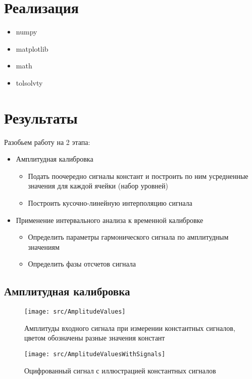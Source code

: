 \documentclass[a4paper]{article}
\begin{document}
\section{Реализация}
\begin{itemize}
    \item numpy
    \item matplotlib
    \item math
    \item tolsolvty
\end{itemize}

\section{Результаты}
    Разобьем работу на 2 этапа:
    \begin{itemize}
        \item Амплитудная калибровка
        \begin{itemize}
            \item Подать поочередно сигналы констант и построить по ним усредненные значения для каждой ячейки (набор уровней)
            \item Построить кусочно-линейную интерполяцию сигнала
        \end{itemize}
        \item Применение интервального анализа к временной калибровке
            \begin{itemize}
                \item Определить параметры гармонического сигнала по амплитудным значениям
                \item Определить фазы отсчетов сигнала
            \end{itemize}
    \end{itemize}

    \subsection{Амплитудная калибровка}
        \begin{figure}[H]
            \centering
            \texttt{[image: src/AmplitudeValues]}
            \caption{Амплитуды входного сигнала при измерении константных сигналов, цветом обозначены разные значения констант}
        \end{figure}

    \begin{figure}[H]
        \centering
        \texttt{[image: src/AmplitudeValuesWithSignals]}
        \caption{Оцифрованный сигнал с иллюстрацией константных сигналов}
    \end{figure}
\end{document}
